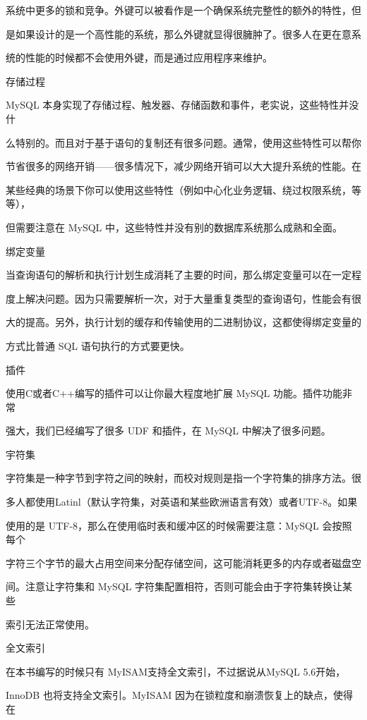 系统中更多的锁和竞争。外键可以被看作是一个确保系统完整性的额外的特性，但

是如果设计的是一个高性能的系统，那么外键就显得很臃肿了。很多人在更在意系

统的性能的时候都不会使用外键，而是通过应用程序来维护。

存储过程

MySQL 本身实现了存储过程、触发器、存储函数和事件，老实说，这些特性并没什

么特别的。而且对于基于语句的复制还有很多问题。通常，使用这些特性可以帮你

节省很多的网络开销——很多情况下，减少网络开销可以大大提升系统的性能。在

某些经典的场景下你可以使用这些特性（例如中心化业务逻辑、绕过权限系统，等等），

但需要注意在 MySQL 中，这些特性并没有别的数据库系统那么成熟和全面。

绑定变量

当查询语句的解析和执行计划生成消耗了主要的时间，那么绑定变量可以在一定程

度上解决问题。因为只需要解析一次，对于大量重复类型的查询语句，性能会有很

大的提高。另外，执行计划的缓存和传输使用的二进制协议，这都使得绑定变量的

方式比普通 SQL 语句执行的方式要更快。

插件

使用C或者C++编写的插件可以让你最大程度地扩展 MySQL 功能。插件功能非常

强大，我们已经编写了很多 UDF 和插件，在 MySQL 中解决了很多问题。

宇符集

字符集是一种字节到字符之间的映射，而校对规则是指一个字符集的排序方法。很

多人都使用Latinl（默认字符集，对英语和某些欧洲语言有效）或者UTF-8。如果

使用的是 UTF-8，那么在使用临时表和缓冲区的时候需要注意：MySQL 会按照每个

字符三个字节的最大占用空间来分配存储空间，这可能消耗更多的内存或者磁盘空

间。注意让字符集和 MySQL 字符集配置相符，否则可能会由于字符集转换让某些

索引无法正常使用。

全文索引

在本书编写的时候只有 MyISAM支持全文索引，不过据说从MySQL 5.6开始，

InnoDB 也将支持全文索引。MyISAM 因为在锁粒度和崩溃恢复上的缺点，使得在

